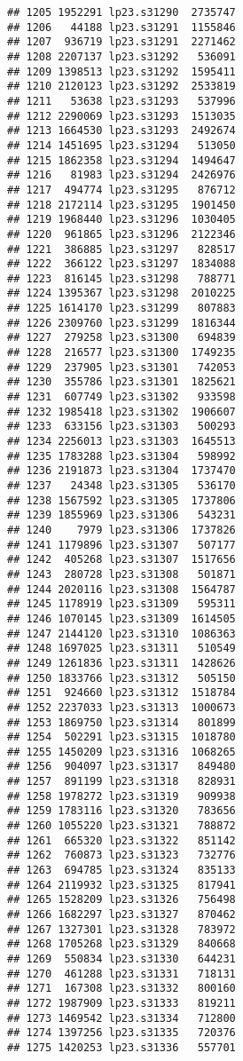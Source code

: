 \documentclass[
]{article}
\begin{document}
\begin{verbatim}
## 1205 1952291 lp23.s31290  2735747
## 1206   44188 lp23.s31291  1155846
## 1207  936719 lp23.s31291  2271462
## 1208 2207137 lp23.s31292   536091
## 1209 1398513 lp23.s31292  1595411
## 1210 2120123 lp23.s31292  2533819
## 1211   53638 lp23.s31293   537996
## 1212 2290069 lp23.s31293  1513035
## 1213 1664530 lp23.s31293  2492674
## 1214 1451695 lp23.s31294   513050
## 1215 1862358 lp23.s31294  1494647
## 1216   81983 lp23.s31294  2426976
## 1217  494774 lp23.s31295   876712
## 1218 2172114 lp23.s31295  1901450
## 1219 1968440 lp23.s31296  1030405
## 1220  961865 lp23.s31296  2122346
## 1221  386885 lp23.s31297   828517
## 1222  366122 lp23.s31297  1834088
## 1223  816145 lp23.s31298   788771
## 1224 1395367 lp23.s31298  2010225
## 1225 1614170 lp23.s31299   807883
## 1226 2309760 lp23.s31299  1816344
## 1227  279258 lp23.s31300   694839
## 1228  216577 lp23.s31300  1749235
## 1229  237905 lp23.s31301   742053
## 1230  355786 lp23.s31301  1825621
## 1231  607749 lp23.s31302   933598
## 1232 1985418 lp23.s31302  1906607
## 1233  633156 lp23.s31303   500293
## 1234 2256013 lp23.s31303  1645513
## 1235 1783288 lp23.s31304   598992
## 1236 2191873 lp23.s31304  1737470
## 1237   24348 lp23.s31305   536170
## 1238 1567592 lp23.s31305  1737806
## 1239 1855969 lp23.s31306   543231
## 1240    7979 lp23.s31306  1737826
## 1241 1179896 lp23.s31307   507177
## 1242  405268 lp23.s31307  1517656
## 1243  280728 lp23.s31308   501871
## 1244 2020116 lp23.s31308  1564787
## 1245 1178919 lp23.s31309   595311
## 1246 1070145 lp23.s31309  1614505
## 1247 2144120 lp23.s31310  1086363
## 1248 1697025 lp23.s31311   510549
## 1249 1261836 lp23.s31311  1428626
## 1250 1833766 lp23.s31312   505150
## 1251  924660 lp23.s31312  1518784
## 1252 2237033 lp23.s31313  1000673
## 1253 1869750 lp23.s31314   801899
## 1254  502291 lp23.s31315  1018780
## 1255 1450209 lp23.s31316  1068265
## 1256  904097 lp23.s31317   849480
## 1257  891199 lp23.s31318   828931
## 1258 1978272 lp23.s31319   909938
## 1259 1783116 lp23.s31320   783656
## 1260 1055220 lp23.s31321   788872
## 1261  665320 lp23.s31322   851142
## 1262  760873 lp23.s31323   732776
## 1263  694785 lp23.s31324   835133
## 1264 2119932 lp23.s31325   817941
## 1265 1528209 lp23.s31326   756498
## 1266 1682297 lp23.s31327   870462
## 1267 1327301 lp23.s31328   783972
## 1268 1705268 lp23.s31329   840668
## 1269  550834 lp23.s31330   644231
## 1270  461288 lp23.s31331   718131
## 1271  167308 lp23.s31332   800160
## 1272 1987909 lp23.s31333   819211
## 1273 1469542 lp23.s31334   712800
## 1274 1397256 lp23.s31335   720376
## 1275 1420253 lp23.s31336   557701

\end{verbatim}
\end{document}
